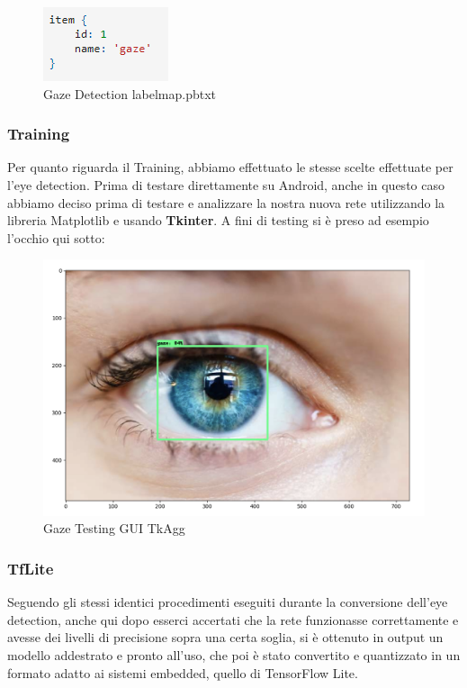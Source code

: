 \documentclass[11pt]{article}
\begin{document}
\begin{figure}[h]
\caption{Gaze Detection labelmap.pbtxt}
\centering
\includegraphics[scale=1]{img/item2.png}
\end{figure}

\subsubsection{Training}
Per quanto riguarda il Training, abbiamo effettuato le stesse scelte effettuate per l'eye detection.
\newline
Prima di testare direttamente su Android, anche in questo caso abbiamo deciso prima di testare e analizzare la nostra nuova rete utilizzando la libreria Matplotlib e usando \textbf{Tkinter}.
\newline
\newline
A fini di testing si è preso ad esempio l'occhio qui sotto:

\begin{figure}[h]
\caption{Gaze Testing GUI TkAgg }
\centering
\includegraphics[scale=0.18]{img/pupilla.png}
\end{figure}

\subsubsection{TfLite}
Seguendo gli stessi identici procedimenti eseguiti durante la conversione dell'eye detection, anche qui dopo esserci accertati che la rete funzionasse correttamente e avesse dei livelli di precisione sopra una certa soglia, si è ottenuto in output un modello addestrato
e pronto all’uso, che poi è stato convertito e quantizzato in un formato adatto ai sistemi embedded, quello di TensorFlow Lite.
\end{document}
